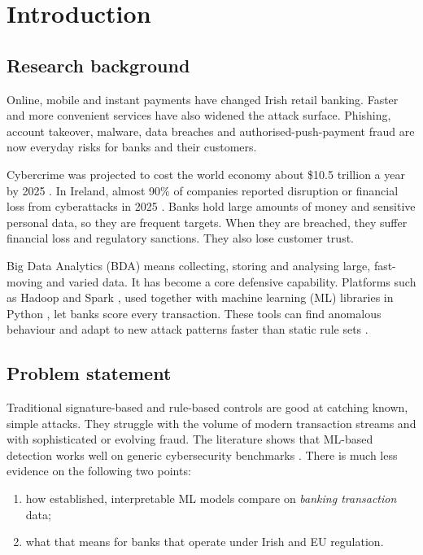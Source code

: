 \documentclass[12pt,a4paper]{article}
\begin{document}
\newpage
\tableofcontents
\newpage

\section{Introduction}

\subsection{Research background}
Online, mobile and instant payments have changed Irish retail banking. Faster and more convenient services have also widened the attack surface. Phishing, account takeover, malware, data breaches and authorised-push-payment fraud are now everyday risks for banks and their customers.

Cybercrime was projected to cost the world economy about \$10.5 trillion a year by 2025 \citep{cybersecurityventures2020}. In Ireland, almost 90\% of companies reported disruption or financial loss from cyberattacks in 2025 \citep{irishtimes2025}. Banks hold large amounts of money and sensitive personal data, so they are frequent targets. When they are breached, they suffer financial loss and regulatory sanctions. They also lose customer trust.

Big Data Analytics (BDA) means collecting, storing and analysing large, fast-moving and varied data. It has become a core defensive capability. Platforms such as Hadoop and Spark \citep{zaharia2016spark}, used together with machine learning (ML) libraries in Python \citep{pedregosa2011scikit, niazi2024bigdata}, let banks score every transaction. These tools can find anomalous behaviour and adapt to new attack patterns faster than static rule sets \citep{buczak2016survey, ofoegbu2024realtime}.

\subsection{Problem statement}
Traditional signature-based and rule-based controls are good at catching known, simple attacks. They struggle with the volume of modern transaction streams and with sophisticated or evolving fraud. The literature shows that ML-based detection works well on generic cybersecurity benchmarks \citep{ahmad2021network, hozouri2025comprehensive}. There is much less evidence on the following two points:
\begin{enumerate}[label=(\roman*)]
\item how established, interpretable ML models compare on \emph{banking transaction} data;
\item what that means for banks that operate under Irish and EU regulation.
\end{enumerate}
\end{document}
